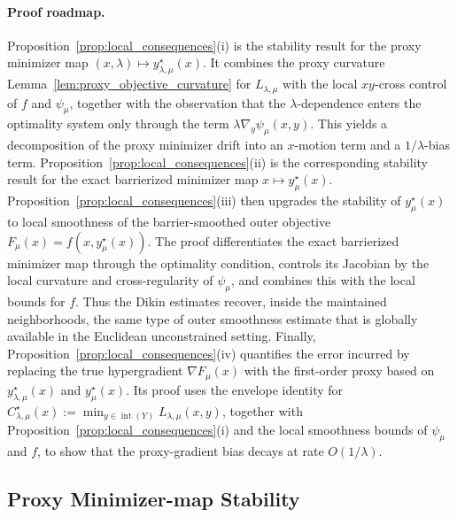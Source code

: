\documentclass{article}
\begin{document}
\paragraph{Proof roadmap.}
Proposition~\ref{prop:local_consequences}\textup{(i)} is the stability result for the proxy minimizer
map \((x,\lambda)\mapsto y_{\lambda,\mu}^\star(x)\). It combines the proxy curvature Lemma~\ref{lem:proxy_objective_curvature} for
\(L_{\lambda,\mu}\) with the local \(xy\)-cross control of \(f\) and \(\psi_\mu\), together with the
observation that the \(\lambda\)-dependence enters the optimality system only through the term
\(\lambda\nabla_y\psi_\mu(x,y)\). This yields a decomposition of the proxy minimizer drift into an
\(x\)-motion term and a \(1/\lambda\)-bias term. Proposition~\ref{prop:local_consequences}\textup{(ii)}
is the corresponding stability result for the exact barrierized minimizer map
\(x\mapsto y_\mu^\star(x)\). Proposition~\ref{prop:local_consequences}\textup{(iii)} then upgrades the stability of
\(y_\mu^\star(x)\) to local smoothness of the barrier-smoothed outer objective
\(F_\mu(x)=f(x,y_\mu^\star(x))\). The proof differentiates the exact barrierized minimizer map
through the optimality condition, controls its Jacobian by the local curvature and cross-regularity of
\(\psi_\mu\), and combines this with the local bounds for \(f\). Thus the Dikin estimates recover,
inside the maintained neighborhoods, the same type of outer smoothness estimate that is globally available in
the Euclidean unconstrained setting. Finally, Proposition~\ref{prop:local_consequences}\textup{(iv)} quantifies the error incurred by
replacing the true hypergradient \(\nabla F_\mu(x)\) with the first-order proxy based on
\(y_{\lambda,\mu}^\star(x)\) and \(y_\mu^\star(x)\). Its proof uses the envelope identity for
\(C_{\lambda,\mu}^\star(x):=\min_{y\in\operatorname{int}(Y)}L_{\lambda,\mu}(x,y)\), together with
Proposition~\ref{prop:local_consequences}\textup{(i)} and the local smoothness bounds of
\(\psi_\mu\) and \(f\), to show that the proxy-gradient bias decays at rate \(O(1/\lambda)\).


\subsection{Proxy Minimizer-map Stability}
\label{sec:proxy minimizer-map}
\end{document}
